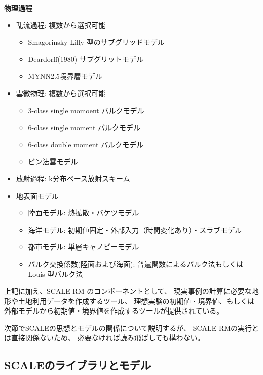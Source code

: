 {\bf 物理過程}
\begin{itemize}
 \item 乱流過程: 複数から選択可能
   \begin{itemize}
    \item Smagorinsky-Lilly 型のサブグリッドモデル \citep{smagorinsky_1963,lilly_1962,Brown_etal_1994,Scotti_1993}
    \item Deardorff(1980) サブグリットモデル \citep{Deardorff_1980}
    \item MYNN2.5境界層モデル \citep{my_1982,nakanishi_2004}
   \end{itemize}
 \item 雲微物理: 複数から選択可能
   \begin{itemize}
    \item 3-class single momoent バルクモデル\citep{kessler_1969}
    \item 6-class single moment バルクモデル \citep{tomita_2008}
    \item 6-class double moment バルクモデル \citep{sn_2014}
    \item ビン法雲モデル \citep{suzuki_etal_2010}
   \end{itemize}
 \item 放射過程: k分布ベース放射スキーム\citep{sekiguchi_2008}
 \item 地表面モデル
  \begin{itemize}
   \item 陸面モデル: 熱拡散・バケツモデル
   \item 海洋モデル: 初期値固定・外部入力（時間変化あり）・スラブモデル
   \item 都市モデル: 単層キャノピーモデル \citep{kusaka_2001}
   \item バルク交換係数(陸面および海面): 普遍関数によるバルク法\citep{beljaars_1991,wilson_2001}もしくは Louis 型バルク法\citep{uno_1995}
  \end{itemize}
\end{itemize}

上記に加え、SCALE-RM のコンポーネントとして、
現実事例の計算に必要な地形や土地利用データを作成するツール、
理想実験の初期値・境界値、もしくは外部モデルから初期値・境界値を作成するツールが提供されている。

次節でSCALEの思想とモデルの関係について説明するが、
SCALE-RMの実行とは直接関係ないため、
必要なければ読み飛ばしても構わない。


\subsection{SCALEのライブラリとモデル} \label{subsec:scalelib_model}

